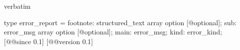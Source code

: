 \begin{camlexample}{verbatim}
\begin{caml}
\begin{camlinput}
type error_report = {
  footnote: structured_text array option [@optional];
  sub: error_msg array option [@optional];
  main: error_msg;
  kind: error_kind;
} [@@since 0.1]
[@@version 0.1]
\end{camlinput}
\end{caml}
\end{camlexample}

